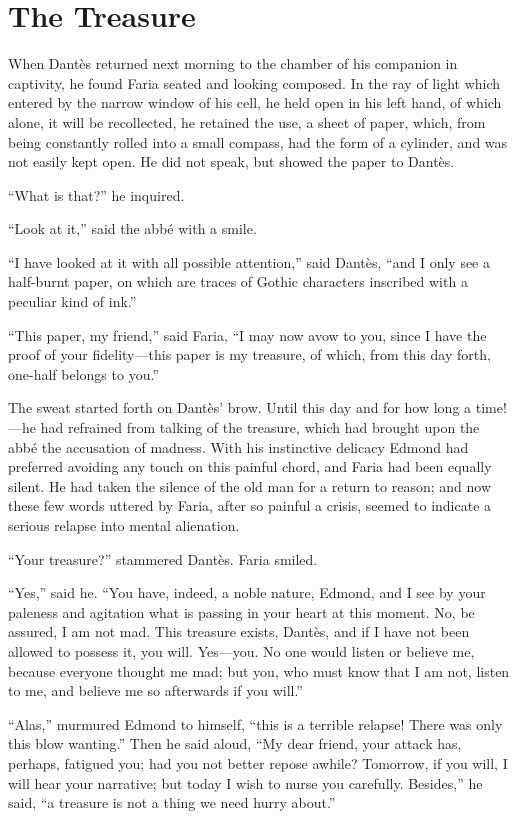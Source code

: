 \chapter{The Treasure}

When Dantès returned next morning to the chamber of his companion in
captivity, he found Faria seated and looking composed. In the ray of
light which entered by the narrow window of his cell, he held open in
his left hand, of which alone, it will be recollected, he retained the
use, a sheet of paper, which, from being constantly rolled into a small
compass, had the form of a cylinder, and was not easily kept open. He
did not speak, but showed the paper to Dantès.

“What is that?” he inquired.

“Look at it,” said the abbé with a smile.

“I have looked at it with all possible attention,” said Dantès, “and I
only see a half-burnt paper, on which are traces of Gothic characters
inscribed with a peculiar kind of ink.”

“This paper, my friend,” said Faria, “I may now avow to you, since I
have the proof of your fidelity—this paper is my treasure, of which,
from this day forth, one-half belongs to you.”

The sweat started forth on Dantès’ brow. Until this day and for how
long a time!—he had refrained from talking of the treasure, which had
brought upon the abbé the accusation of madness. With his instinctive
delicacy Edmond had preferred avoiding any touch on this painful chord,
and Faria had been equally silent. He had taken the silence of the old
man for a return to reason; and now these few words uttered by Faria,
after so painful a crisis, seemed to indicate a serious relapse into
mental alienation.

“Your treasure?” stammered Dantès. Faria smiled.

“Yes,” said he. “You have, indeed, a noble nature, Edmond, and I see by
your paleness and agitation what is passing in your heart at this
moment. No, be assured, I am not mad. This treasure exists, Dantès, and
if I have not been allowed to possess it, you will. Yes—you. No one
would listen or believe me, because everyone thought me mad; but you,
who must know that I am not, listen to me, and believe me so afterwards
if you will.”

“Alas,” murmured Edmond to himself, “this is a terrible relapse! There
was only this blow wanting.” Then he said aloud, “My dear friend, your
attack has, perhaps, fatigued you; had you not better repose awhile?
Tomorrow, if you will, I will hear your narrative; but today I wish to
nurse you carefully. Besides,” he said, “a treasure is not a thing we
need hurry about.”

